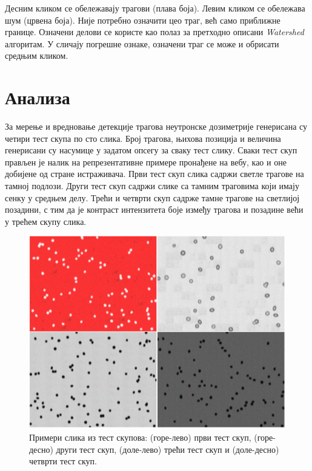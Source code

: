\documentclass[11pt,a4paper,serbian,oneside]{book}
\begin{document}
Десним кликом се обележавају трагови (плава боја). Левим кликом се обележава шум (црвена боја). Није потребно означити цео траг, већ само приближне границе.
Означени делови се користе као полаз за претходно описани \textit{Watershed} алгоритам. У сличају погрешне ознаке, означени траг се може и обрисати средњим кликом.

%
%
%

\chapter{Анализа}

За мерење и вредновање детекције трагова неутронске дозиметрије генерисана су четири тест скупа по сто слика. Број трагова, њихова позиција и величина генерисани су насумице у задатом опсегу за сваку тест слику. Сваки тест скуп прављен је налик на репрезентативне примере пронађене на вебу, као и оне добијене од стране истраживача. Први тест скуп слика садржи светле трагове на тамној подлози. Други тест скуп садржи слике са тамним траговима који имају сенку у средњем делу. Трећи и четврти скуп садрже тамне трагове на светлијој позадини, с тим да је контраст интензитета боје између трагова и позадине већи у трећем скупу слика.

\begin{figure}[h]
\begin{center}
\includegraphics[width=150mm]{images/test.png}
\end{center}
\caption{Примери слика из тест скупова: (горе-лево) први тест скуп, (горе-десно) други тест скуп, (доле-лево) трећи тест скуп и (доле-десно) четврти тест скуп.}
\label{fig:test}
\end{figure}
\end{document}
